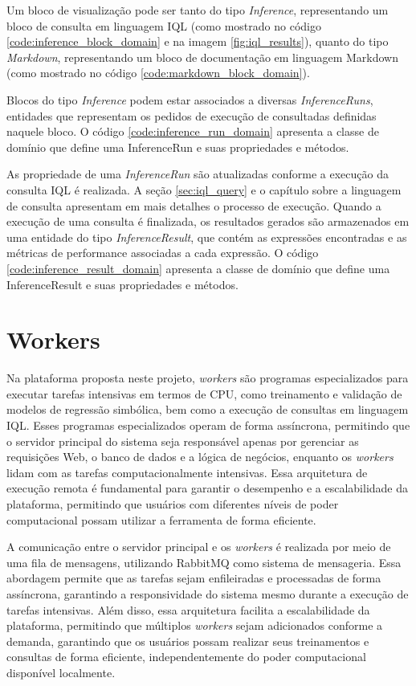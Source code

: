 Um bloco de visualização pode ser tanto do tipo \textit{Inference}, representando um bloco de consulta em linguagem IQL (como mostrado no código \ref{code:inference_block_domain} e na imagem \ref{fig:iql_results}), quanto do tipo \textit{Markdown}, representando um bloco de documentação em linguagem Markdown (como mostrado no código \ref{code:markdown_block_domain}).

Blocos do tipo \textit{Inference} podem estar associados a diversas \textit{InferenceRuns}, entidades que representam os pedidos de execução de consultadas definidas naquele bloco. O código \ref{code:inference_run_domain} apresenta a classe de domínio que define uma InferenceRun e suas propriedades e métodos.

As propriedade de uma \textit{InferenceRun} são atualizadas conforme a execução da consulta IQL é realizada. A seção \ref{sec:iql_query} e o capítulo sobre a linguagem de consulta apresentam em mais detalhes o processo de execução. Quando a execução de uma consulta é finalizada, os resultados gerados são armazenados em uma entidade do tipo \textit{InferenceResult}, que contém as expressões encontradas e as métricas de performance associadas a cada expressão. O código \ref{code:inference_result_domain} apresenta a classe de domínio que define uma InferenceResult e suas propriedades e métodos.

\section{Workers}
Na plataforma proposta neste projeto, \textit{workers} são programas especializados para executar tarefas intensivas em termos de CPU, como treinamento e validação de modelos de regressão simbólica, bem como a execução de consultas em linguagem IQL. Esses programas especializados operam de forma assíncrona, permitindo que o servidor principal do sistema seja responsável apenas por gerenciar as requisições Web, o banco de dados e a lógica de negócios, enquanto os \textit{workers} lidam com as tarefas computacionalmente intensivas. Essa arquitetura de execução remota é fundamental para garantir o desempenho e a escalabilidade da plataforma, permitindo que usuários com diferentes níveis de poder computacional possam utilizar a ferramenta de forma eficiente.

A comunicação entre o servidor principal e os \textit{workers} é realizada por meio de uma fila de mensagens, utilizando RabbitMQ como sistema de mensageria. Essa abordagem permite que as tarefas sejam enfileiradas e processadas de forma assíncrona, garantindo a responsividade do sistema mesmo durante a execução de tarefas intensivas. Além disso, essa arquitetura facilita a escalabilidade da plataforma, permitindo que múltiplos \textit{workers} sejam adicionados conforme a demanda, garantindo que os usuários possam realizar seus treinamentos e consultas de forma eficiente, independentemente do poder computacional disponível localmente.

